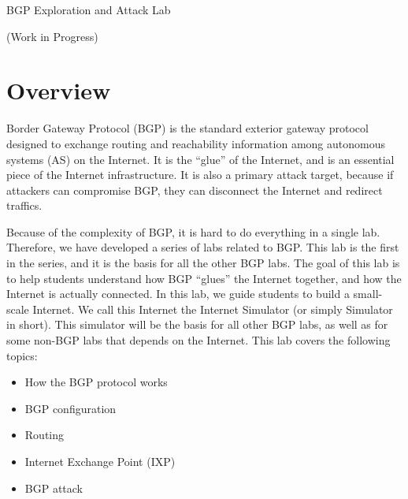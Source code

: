 
\newcommand{\commonfolder}{../../common-files}





\newcommand{\bgpFigs}{./Figs}




\begin{center}
{\LARGE BGP Exploration and Attack Lab}

  \vspace{0.1in}
  {\LARGE (Work in Progress)}
\end{center}


\tableofcontents




\section{Overview}

Border Gateway Protocol (BGP) is the standard exterior gateway protocol
designed to exchange routing and reachability information among autonomous
systems (AS) on the Internet. It is the ``glue'' of the Internet,
and is an essential piece of the Internet infrastructure. It is 
also a primary attack target, because if attackers can 
compromise BGP, they can disconnect the Internet and redirect traffics. 

Because of the complexity of BGP, it is hard to do everything in a single lab. 
Therefore, we have developed a series of labs related to BGP. This lab
is the first in the series, and it is the basis for all the other BGP labs.  
The goal of this lab is to help students understand how
BGP ``glues'' the Internet together, and how the Internet is actually
connected. In this lab, we guide students to build a small-scale Internet.
We call this Internet the Internet Simulator (or simply
Simulator in short). This simulator will be the basis for 
all other BGP labs, as well as for some non-BGP labs that 
depends on the Internet. 
This lab covers the following topics:
\begin{itemize}[noitemsep]
\item How the BGP protocol works
\item BGP configuration
\item Routing 
\item Internet Exchange Point (IXP)
\item BGP attack
\end{itemize}


